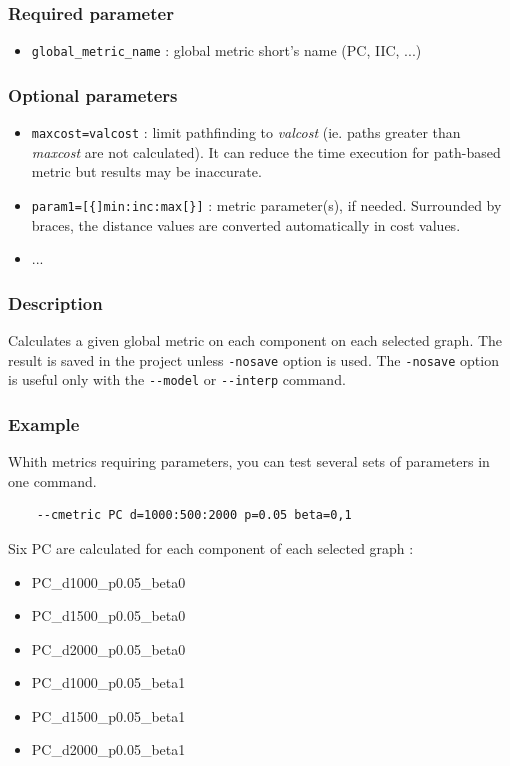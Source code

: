 \documentclass[a4paper,10pt]{report}
\begin{document}
\subsubsection{Required parameter}
\begin{itemize}
	\item \verb|global_metric_name| : global metric short's name (PC, IIC, ...)
\end{itemize}

\subsubsection{Optional parameters}
\begin{itemize}
	\item \verb|maxcost=valcost| : limit pathfinding to \textit{valcost} (ie. paths greater than \textit{maxcost} are not calculated). It can reduce the time execution for path-based metric but results may be inaccurate.
	\item \verb|param1=[{]min:inc:max[}]| : metric parameter(s), if needed. Surrounded by braces, the distance values are converted automatically in cost values.
	\item ...
\end{itemize}

\subsubsection{Description}
Calculates a given global metric on each component on each selected graph.
The result is saved in the project unless \verb|-nosave| option is used. The \verb|-nosave| option is useful only with the \verb|--model| or \verb|--interp| command.

\subsubsection{Example}
Whith metrics requiring parameters, you can test several sets of parameters in one command.
\begin{Verbatim}
	--cmetric PC d=1000:500:2000 p=0.05 beta=0,1
\end{Verbatim}
Six PC are calculated for each component of each selected graph :
\begin{itemize}
 \item PC\_d1000\_p0.05\_beta0
 \item PC\_d1500\_p0.05\_beta0
 \item PC\_d2000\_p0.05\_beta0
 \item PC\_d1000\_p0.05\_beta1
 \item PC\_d1500\_p0.05\_beta1
 \item PC\_d2000\_p0.05\_beta1
\end{itemize}
\end{document}
